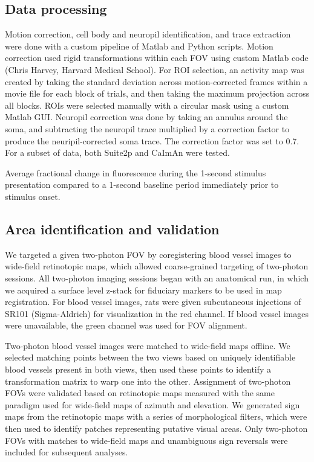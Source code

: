 \subsection{Data processing}
Motion correction, cell body and neuropil identification, and trace extraction were done with a custom pipeline of Matlab and Python scripts. Motion correction used rigid transformations within each FOV using custom Matlab code (Chris Harvey, Harvard Medical School). For ROI selection, an activity map was created by taking the standard deviation across motion-corrected frames within a movie file for each block of trials, and then taking the maximum projection across all blocks. ROIs were selected manually with a circular mask using a custom Matlab GUI. Neuropil correction was done by taking an annulus around the soma, and subtracting the neuropil trace multiplied by a correction factor to produce the neuripil-corrected soma trace. The correction factor was set to 0.7. For a subset of data, both Suite2p and CaImAn were tested.

Average fractional change in fluorescence during the 1-second stimulus presentation compared to a 1-second baseline period immediately prior to stimulus onset.

\subsection{Area identification and validation}
We targeted a given two-photon FOV by coregistering blood vessel images to wide-field retinotopic maps, which allowed coarse-grained targeting of two-photon sessions. All two-photon imaging sessions began with an anatomical run, in which we acquired a surface level z-stack for fiduciary markers to be used in map registration. For blood vessel images, rats were given subcutaneous injections of SR101 (Sigma-Aldrich) for visualization in the red channel. If blood vessel images were unavailable, the green channel was used for FOV alignment. 

Two-photon blood vessel images were matched to wide-field maps offline. We selected matching points between the two views based on uniquely identifiable blood vessels present in both views, then used these points to identify a transformation matrix to warp one into the other. Assignment of two-photon FOVs were validated based on retinotopic maps measured with the same paradigm used for wide-field maps of azimuth and elevation. We generated sign maps from the retinotopic maps with a series of morphological filters\cite{Marshel2011, Garrett2014, Zhuang2017}, which were then used to identify patches representing putative visual areas. Only two-photon FOVs with matches to wide-field maps and unambiguous sign reversals were included for subsequent analyses. 

